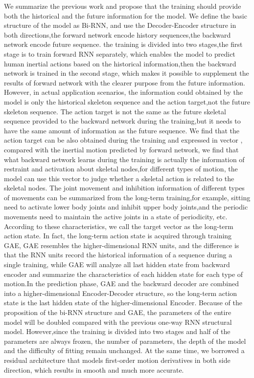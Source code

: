 \documentclass[conference]{IEEEtran}
\begin{document}
We summarize the previous work and propose that the training should provide both the historical and the future information for the model. We define the basic structure of the model as Bi-RNN, and use the Decoder-Encoder structure in both directions,the forward network encode history sequences,the backward network encode future sequence. the training is divided into two stages,the first stage is to train forward RNN separately, which enables the model to predict human inertial actions based on the historical information,then the backward network is trained in the second stage, which makes it possible to supplement the results of forward network with the clearer purpose from the future information. However, in actual application scenarios, the information could obtained by the model is only the historical skeleton sequence and the action target,not the future skeleton sequence. The action target is not the same as the future skeletal sequence provided to the backward network during the training,but it needs to have the same amount of information as the future sequence. 
We find that the action target can be also obtained during the training and expressed in vector , compared with the inertial motion predicted by forward network, we find that what backward network learns during the training is actually the information of restraint and activation about skeletal nodes,for different types of motion, the model can use this vector to judge whether a skeletal action is related to the skeletal nodes. The joint movement and inhibition information of different types of movements can be summarized from the long-term training,for example, sitting  need to activate lower body joints and inhibit upper body joints,and the periodic movements need to maintain the active joints in a state of periodicity, etc. According to these characteristics, we call the target vector as the long-term action state. In fact, the long-term action state is acquired through training GAE, GAE resembles the higher-dimensional RNN units, and the difference is that the RNN units record the historical information of a sequence during a single training, while GAE will analyze all last hidden state from backward encoder and summarize the characteristics of each hidden state for each type of motion.In the prediction phase, GAE and the backward decoder are combined into a higher-dimensional Encoder-Decoder structure, so the long-term action state is the last hidden state of the higher-dimensional Encoder.
Because of the proposition of the bi-RNN structure and GAE, the parameters of the entire model will be doubled compared with the previous one-way RNN structural model. However,since the training is divided into two stages and half of the parameters are always frozen, the number of parameters, the depth of the model and the difficulty of fitting remain unchanged. At the same time, we borrowed a residual architecture that models first-order motion derivatives in both side direction, which results in smooth and much more accurate.
\end{document}
